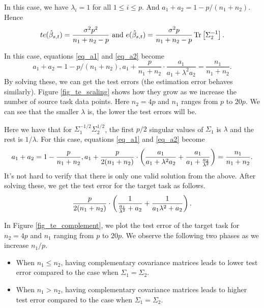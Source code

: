 \begin{example}[\textbf{When $\Sigma_1 = \Sigma_2$}]
In this case, we have $\lambda_i = 1$ for all $1\le i\le p$.
And $a_1 + a_2 = 1 - p / (n_1 + n_2)$.
Hence
\[ te(\hat{\beta}_{s,t}) = \frac{\sigma^2 p^2}{n_1 + n_2 - p} \text{ and } e(\hat{\beta}_{s,t}) = \frac {\sigma^2 p} {n_1 + n_2 - p} \operatorname{Tr}\left[\Sigma_2^{-1}\right]. \]
\end{example}

\smallskip
\begin{example}[\textbf{When $\Sigma_1 = \Sigma_2 / \lambda$}]
In this case, equations \eqref{eq_a1} and \eqref{eq_a2} become
\[ a_1 + a_2 = 1 - p/(n_1 + n_2), a_1 + \frac{p}{n_1 + n_2} \cdot \frac {a_1} {a_1 + \lambda^2 a_2} = \frac{n_1} {n_1 + n_2}. \]
By solving these, we can get the test errors (the estimation error behaves similarly).
Figure \ref{fig_te_scaling} shows how they grow as we increase the number of source task data points.
Here $n_2 = 4p$ and $n_1$ ranges from $p$ to $20p$.
We can see that the smaller $\lambda$ is, the lower the test errors will be.
\end{example}

\smallskip
\begin{example}
Here we have that for $\Sigma_1^{-1/2}\Sigma_2^{1/2}$, the first $p/2$ singular values of $\Sigma_1$ is $\lambda$ and the rest is $1/\lambda$.
For this case, equations \eqref{eq_a1} and \eqref{eq_a2} become
\[ a_1 + a_2 = 1 - \frac{p}{n_1 + n_2}, a_1 + \frac{p}{2(n_1 + n_2)}\cdot \left({\frac{a_1}{a_1 + \lambda^2 a_2} + \frac{a_1}{a_1 + \frac{a_2}{\lambda^2}}}\right) = \frac{n_1}{n_1 + n_2}. \]
It's not hard to verify that there is only one valid solution from the above.
After solving these, we get the test error for the target task as follows.
\[ \frac{p}{2(n_1 + n_2)} \cdot \left({\frac{1}{\frac{a_1}{\lambda^2} + a_2} + \frac{1}{a_1\lambda^2 + a_2}}\right).\]
\end{example}

In Figure \ref{fig_te_complement}, we plot the test error of the target task for $n_2 = 4p$ and $n_1$ ranging from $p$ to $20p$.
We observe the following two phases as we increase $n_1 / p$.
\begin{itemize}
	\item When $n_1 \le n_2$, having complementary covariance matrices leads to lower test error compared to the case when $\Sigma_1 = \Sigma_2$.
	\item When $n_1 > n_2$, having complementary covariance matrices leads to higher test error compared to the case when $\Sigma_1 = \Sigma_2$.
\end{itemize}

